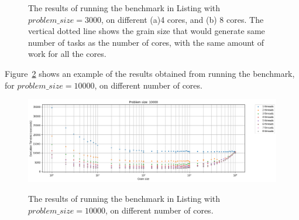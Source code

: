 \vspace{\baselineskip}	
\begin{figure}[H]
	\centering
	\caption{The results of running the benchmark in Listing with $problem\_size=3000$, on different (a)4 cores, and (b) 8 cores. The vertical dotted line shows the grain size that would generate same number of tasks as the number of cores, with the same amount of work for all the cores.}\label{fig40}		
\end{figure}
 
 
 
Figure~\ref{fig39} shows an example of the results obtained from running the benchmark, for $problem\_size=10000$, on different number of cores.

\vspace{\baselineskip}	
\begin{figure}[H]
	\centering
	{\includegraphics[scale=.45]{images/hpx_for_loop/10000_8_all.png}}
	\caption{The results of running the benchmark in Listing with $problem\_size=10000$, on different number of cores.}\label{fig39}		
\end{figure}

